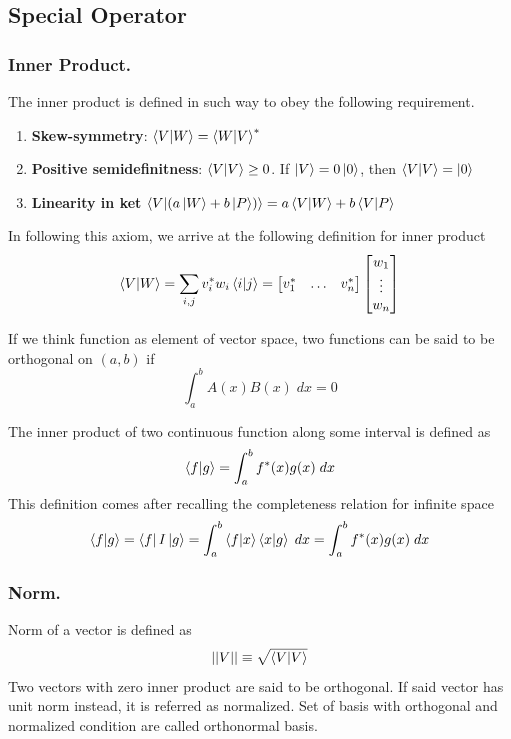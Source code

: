 \documentclass[../../../main.tex]{subfiles}
\begin{document}
\subsection{Special Operator}

\subsubsection{Inner Product.}
The inner product is defined in such way to obey the following requirement.
\begin{enumerate}
	\item \textbf{Skew-symmetry}: $\braket{V|W}=\braket{W|V}^*$
	\item \textbf{Positive semidefinitness}: $\braket{V|V}\geq 0$. If $\ket{V}=0\ket{0}$, then $\braket{V|V}=\ket{0}$
	\item \textbf{Linearity in ket} $\braket{V|(a \ket{W}+b \ket{P})}=a\braket{V|W}+b\braket{V|P}$
\end{enumerate}
In following this axiom, we arrive at the following definition for inner product
\begin{equation*}
	\braket{V|W}=\sum_{i,j}v_i^*w_i\braket{i|j}=\begin{bmatrix}
		v_1^* & \dots & v_n^*
	\end{bmatrix}
	\begin{bmatrix}
		w_1    \\
		\vdots \\
		w_n
	\end{bmatrix}
\end{equation*}

If we think function as element of vector space, two functions can be said to be orthogonal on $(a,b)$ if
\begin{equation*}
	\int_{a}^{b}A(x)B(x)\;dx=0
\end{equation*}

The inner product of two continuous function along some interval is defined as
\begin{equation*}
	\braket{f|g}=\int_{a}^{b}f ^*(x)g(x)\;dx
\end{equation*}
This definition comes after recalling the completeness relation for infinite space
\begin{equation*}
	\braket{f|g}=\bra{f}I \ket{g}=\int_{a }^{b}\braket{f|x}\braket{x|g}\;dx=\int_{a }^{b} f ^*(x)g(x)\;dx
\end{equation*}

\subsubsection{Norm.}
Norm of a vector is defined as
\begin{equation*}
	||V||\equiv\sqrt{\braket{V|V}}
\end{equation*}
Two vectors with zero inner product are said to be orthogonal.
If said vector has unit norm instead, it is referred as normalized.
Set of basis with orthogonal and normalized condition are called orthonormal basis.
\end{document}
